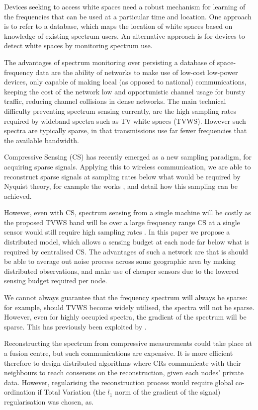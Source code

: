 \documentclass[conference]{IEEEtran}
\begin{document}
Devices seeking to access white spaces need a robust mechanism for learning of the frequencies that can be used at a particular time and location. One approach is to refer to a database, which maps the location of white spaces based on knowledge of existing spectrum users. An alternative approach is for devices to detect white spaces by monitoring spectrum use. 

The advantages of spectrum monitoring \cite{akan2009cognitive} over persisting a database of space-frequency data are the ability of networks to make use of low-cost low-power devices, only capable of making local (as opposed to national) communications, keeping the cost of the network low and  opportunistic channel usage for bursty traffic, reducing channel collisions in dense networks. The main technical difficulty preventing spectrum sensing currently, are the high sampling rates required by wideband spectra such as TV white spaces (TVWS). However such spectra are typically sparse, in that transmissions use far fewer frequencies that the available bandwidth. 

Compressive Sensing (CS) \cite{Candes2006} has recently emerged as a new sampling paradigm, for acquiring sparse signals. Applying this to wireless communication, we are able to reconstruct sparse signals at sampling rates below what would be required by Nyquist theory, for example the works \cite{mishali2010theory}, and \cite{tropp2010beyond} detail how this sampling can be achieved. 

However, even with CS, spectrum sensing from a single machine will be costly as the proposed TVWS band will be over a large frequency range CS at a single sensor would still require high sampling rates \cite{Zhang2011b}. In this paper we propose a distributed model, which allows a sensing budget at each node far below what is required by centralised CS. The advantages of such a network are that is should be able to average out noise process across some geographic area by making distributed observations, and make use of cheaper sensors due to the lowered sensing budget required per node. 

We cannot always guarantee that the frequency spectrum will always be sparse: for example, should TVWS become widely utilised, the spectra will not be sparse. However, even for highly occupied spectra, the gradient of the spectrum will be sparse. This has previously been exploited by \cite{tian2006wavelet}. 

Reconstructing the spectrum from compressive measurements could take place at a fusion centre, but such communications are expensive. It is more efficient therefore to design distributed algorithms where CRs communicate with their neighbours to reach consensus on the reconstruction, given each nodes' private data. However, regularising the reconstruction process would require global co-ordination if Total Variation (the \(l_1\) norm of the gradient of the signal) regularisation was chosen, as.
\end{document}
